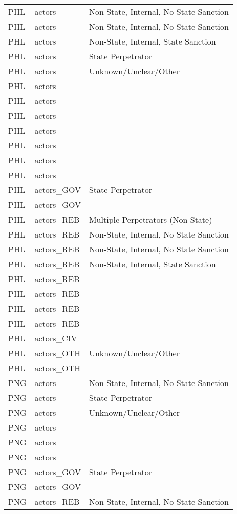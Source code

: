 \begin{table}[ht]
\begin{tabular}{lll}
  PHL & actors & Non-State, Internal, No State Sanction \\ 
  PHL & actors & Non-State, Internal, No State Sanction \\ 
  PHL & actors & Non-State, Internal, State Sanction \\ 
  PHL & actors & State Perpetrator \\ 
  PHL & actors & Unknown/Unclear/Other \\ 
  PHL & actors &  \\ 
  PHL & actors &  \\ 
  PHL & actors &  \\ 
  PHL & actors &  \\ 
  PHL & actors &  \\ 
  PHL & actors &  \\ 
  PHL & actors &  \\ 
  PHL & actors\_GOV & State Perpetrator \\ 
  PHL & actors\_GOV &  \\ 
  PHL & actors\_REB & Multiple Perpetrators (Non-State) \\ 
  PHL & actors\_REB & Non-State, Internal, No State Sanction \\ 
  PHL & actors\_REB & Non-State, Internal, No State Sanction \\ 
  PHL & actors\_REB & Non-State, Internal, State Sanction \\ 
  PHL & actors\_REB &  \\ 
  PHL & actors\_REB &  \\ 
  PHL & actors\_REB &  \\ 
  PHL & actors\_REB &  \\ 
  PHL & actors\_CIV &  \\ 
  PHL & actors\_OTH & Unknown/Unclear/Other \\ 
  PHL & actors\_OTH &  \\ 
  PNG & actors & Non-State, Internal, No State Sanction \\ 
  PNG & actors & State Perpetrator \\ 
  PNG & actors & Unknown/Unclear/Other \\ 
  PNG & actors &  \\ 
  PNG & actors &  \\ 
  PNG & actors &  \\ 
  PNG & actors\_GOV & State Perpetrator \\ 
  PNG & actors\_GOV &  \\ 
  PNG & actors\_REB & Non-State, Internal, No State Sanction \\ 

\end{tabular}
\end{table}
